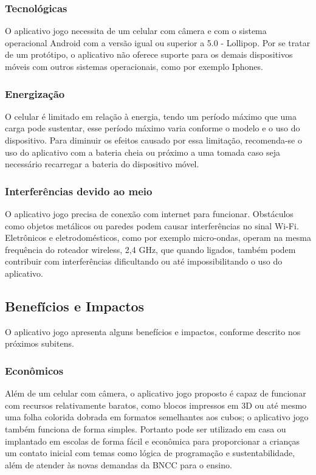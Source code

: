         \subsubsection{Tecnológicas}
        O aplicativo jogo necessita de um celular com câmera e com o sistema operacional Android com a versão igual ou superior a 5.0 - Lollipop. Por se tratar de um protótipo, o aplicativo não oferece suporte para os demais dispositivos móveis com outros sistemas operacionais, como por exemplo Iphones. 
        
        \subsubsection{Energização}
        O celular é limitado em relação à energia, tendo um período máximo que uma carga pode sustentar, esse período máximo varia conforme o modelo e o uso do dispositivo. Para diminuir os efeitos causado por essa limitação, recomenda-se o uso do aplicativo com a bateria cheia ou próximo a uma tomada caso seja necessário recarregar a bateria do dispositivo móvel.    
        
        \subsubsection{Interferências devido ao meio}
        O aplicativo jogo precisa de conexão com internet para funcionar. Obstáculos como objetos metálicos ou paredes podem causar interferências no sinal Wi-Fi. Eletrônicos e eletrodomésticos, como por exemplo micro-ondas, operam na mesma frequência do roteador wireless, 2,4 GHz, que quando ligados, também podem contribuir com interferências dificultando ou até impossibilitando o uso do aplicativo.
    
    \subsection{Benefícios e Impactos}
    O aplicativo jogo apresenta alguns benefícios e impactos, conforme descrito nos próximos subitens.

        \subsubsection{Econômicos}
        Além de um celular com câmera, o aplicativo jogo proposto é capaz de funcionar com recursos relativamente baratos, como blocos impressos em 3D ou até mesmo uma folha colorida dobrada em formatos semelhantes aos cubos; o aplicativo jogo também funciona de forma simples. Portanto pode ser utilizado em casa ou implantado em escolas de forma fácil e econômica para proporcionar a crianças um contato inicial com temas como lógica de programação e sustentabilidade, além de atender às novas demandas da BNCC para o ensino.
        
